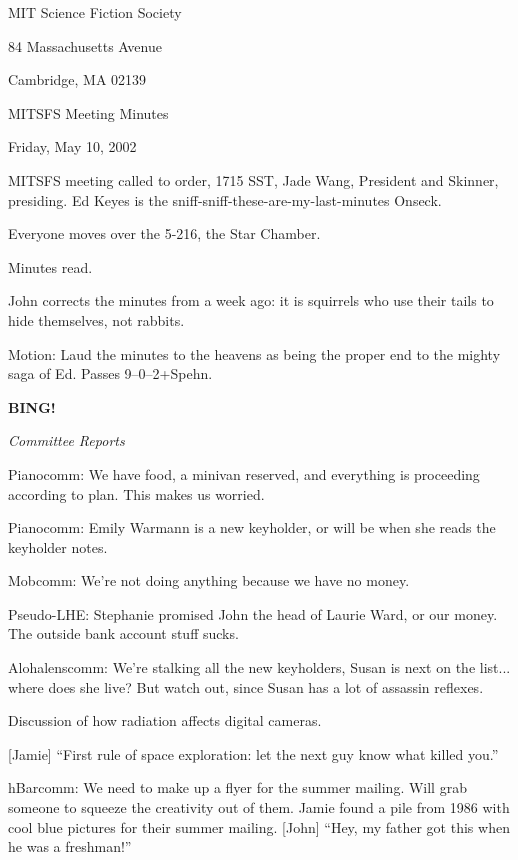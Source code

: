 \documentclass[12pt]{article}
\newcommand{\bing}{{\bf BING!} }
\newcommand{\goto}[1]{\bing \vskip 12pt \centerline{{\em{#1}}}}
\begin{document}
\begin{center}

MIT Science Fiction Society 

84 Massachusetts Avenue

Cambridge, MA 02139

\vspace{12pt}

MITSFS Meeting Minutes 

Friday, May 10, 2002

\end{center}
 
\vspace{18pt}

\setlength{\parskip}{6pt}

\noindent
MITSFS meeting called to order, 1715 SST, Jade Wang, President and
Skinner, presiding.  Ed Keyes is the sniff-sniff-these-are-my-last-minutes
Onseck.

Everyone moves over the 5-216, the Star Chamber.

Minutes read.

John corrects the minutes from a week ago: it is squirrels who use their
tails to hide themselves, not rabbits.

Motion: Laud the minutes to the heavens as being the proper end to the
mighty saga of Ed.  Passes 9--0--2+Spehn.

\goto{Committee Reports}

Pianocomm: We have food, a minivan reserved, and everything is proceeding
according to plan.  This makes us worried.

Pianocomm: Emily Warmann is a new keyholder, or will be when she reads
the keyholder notes.

Mobcomm: We're not doing anything because we have no money.

Pseudo-LHE: Stephanie promised John the head of Laurie Ward, or our
money.  The outside bank account stuff sucks.

Alohalenscomm: We're stalking all the new keyholders,  Susan is next on
the list... where does she live?  But watch out, since Susan has a lot of
assassin reflexes.

Discussion of how radiation affects digital cameras.

[Jamie] ``First rule of space exploration: let the next guy know what
killed you.''

hBarcomm: We need to make up a flyer for the summer mailing.  Will grab
someone to squeeze the creativity out of them.  Jamie found a pile from
1986 with cool blue pictures for their summer mailing.  [John] ``Hey, my
father got this when he was a freshman!''
\end{document}
